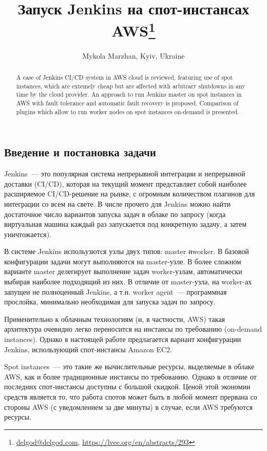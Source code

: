 \documentclass[10pt, a5paper]{article}
\begin{document}
\title{Запуск Jenkins на спот-инстансах AWS\footnote{\url{delgod@delgod.com}, \url{https://lvee.org/en/abstracts/293}}}
\author{Mykola Marzhan, Kyiv, Ukraine}
\maketitle
\begin{abstract}
A case of Jenkins CI/CD system in AWS cloud is reviewed, featuring use of spot instances, which are extemely cheap but are affected with arbitrary shutdowns in any time by the cloud provider. An approach to run Jenkins master on spot instances in AWS with fault tolerance and automatic fault recovery is proposed. Comparison of plugins which allow to run worker nodes on spot instances on-demand is presented.
\end{abstract}
\subsection*{Введение и постановка задачи}

Jenkins~--- это популярная система непрерывной интеграции и непрерывной доставки (CI/CD), которая на текущий момент представляет собой наиболее расширяемое CI/CD-решение на рынке, с огромным количеством плагинов для интеграции со всем на свете. В числе прочего для Jenkins можно найти достаточное число вариантов запуска задач в облаке по запросу (когда виртуальная машина каждый раз  запускается под конкретную задачу, а затем уничтожается).

В системе Jenkins испольузются узлы двух типов: master и\linebreak worker. В базовой конфигурации задачи могут выполняются на master-узле. В более сложном варианте master делегирует выполнение задач worker-узлам, автоматически выбирая наиболее подходящий из них. В отличие от master-узла, на worker-ах запущен не полноценный Jenkins, а т.н. worker agent~--- программная прослойка, минимально необходимая для запуска задач по запросу.

Применительно к облачным технологиям (и, в частности, AWS) такая архитектура очевидно легко переносится на инстансы по требованию (on-demand instances). Однако в настоящей работе предлагается вариант конфигурации Jenkins, использующий спот-\linebreak инстансы Amazon EC2.

Spot instances~--- это такие же вычислительные ресурсы, выделяемые в облаке AWS, как и более традиционные инстансы по требованию. Однако в отличие от последних спот-инстансы доступны с большой скидкой. Ценой этой экономии средств является то, что работа спотов может быть в любой момент прервана со стороны AWS (с  уведомлением за две минуты) в случае, если AWS требуются ресурсы.
\end{document}
